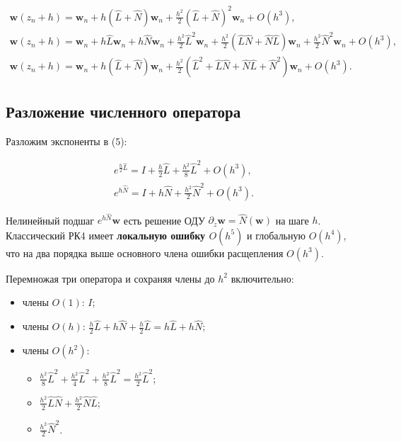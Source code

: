 \documentclass{article}
\begin{document}
\begin{equation}
    \begin{aligned}
        \mathbf{w}(z_n+h) = \mathbf{w}_n + h(\hat L+\hat N)\mathbf{w}_n + \frac{h^2}{2}(\hat L+\hat N)^2\mathbf{w}_n + O(h^3),                                                                                                \\
        \mathbf{w}(z_n+h) = \mathbf{w}_n + h\hat L\mathbf{w}_n + h\hat N\mathbf{w}_n + \frac{h^2}{2}\hat L^2\mathbf{w}_n + \frac{h^2}{2}(\hat L\hat N+\hat N\hat L)\mathbf{w}_n + \frac{h^2}{2}\hat N^2\mathbf{w}_n + O(h^3), \\
        \mathbf{w}(z_n+h) = \mathbf{w}_n + h \left(\hat L + \hat N \right) \mathbf{w}_n + \frac{h^2}{2}\left(\hat L^2 + \hat L\hat N+\hat N\hat L+ \hat N^2 \right)\mathbf{w}_n  + O(h^3).
    \end{aligned}
\end{equation}

\subsection{Разложение численного оператора}

Разложим экспоненты в (5):

\begin{equation}
    \begin{aligned}
        e^{\frac{h}{2}\hat L} = I + \frac{h}{2}\hat L + \frac{h^2}{8}\hat L^2 + O(h^3), \\
        e^{h\hat N} = I + h\hat N + \frac{h^2}{2}\hat N^2 + O(h^3).
    \end{aligned}
\end{equation}

Нелинейный подшаг \(e^{h\hat N}\mathbf{w}\) есть решение ОДУ \(\partial_z \mathbf{w} = \hat N(\mathbf{w})\) на шаге \(h\).
Классический РК4 имеет \textbf{локальную ошибку \(O(h^5)\)} и глобальную \(O(h^4)\), что на два порядка выше основного члена ошибки расщепления \(O(h^3)\).

Перемножая три оператора и сохраняя члены до \(h^2\) включительно:

\begin{itemize}
    \item члены \(O(1)\): \(I\);
    \item члены \(O(h)\): \(\frac{h}{2}\hat L + h\hat N + \frac{h}{2}\hat L = h\hat L + h\hat N\);
    \item члены \(O(h^2)\):
          \begin{itemize}
              \item \(\frac{h^2}{8}\hat L^2 + \frac{h^2}{4}\hat L^2 + \frac{h^2}{8} \hat L^2 = \frac{h^2}{2}\hat L^2\);
              \item \(\frac{h^2}{2}\hat L\hat N + \frac{h^2}{2}\hat N\hat L\);
              \item \(\frac{h^2}{2}\hat N^2\).
          \end{itemize}
\end{itemize}
\end{document}
